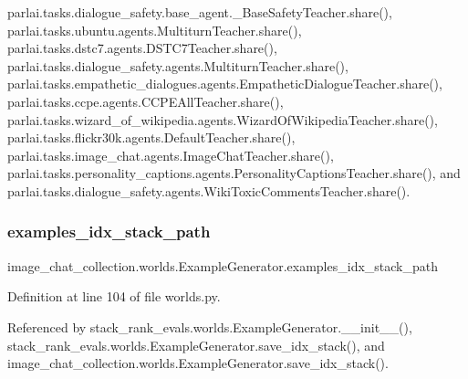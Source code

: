 parlai.\+tasks.\+dialogue\+\_\+safety.\+base\+\_\+agent.\+\_\+\+Base\+Safety\+Teacher.\+share(), parlai.\+tasks.\+ubuntu.\+agents.\+Multiturn\+Teacher.\+share(), parlai.\+tasks.\+dstc7.\+agents.\+D\+S\+T\+C7\+Teacher.\+share(), parlai.\+tasks.\+dialogue\+\_\+safety.\+agents.\+Multiturn\+Teacher.\+share(), parlai.\+tasks.\+empathetic\+\_\+dialogues.\+agents.\+Empathetic\+Dialogue\+Teacher.\+share(), parlai.\+tasks.\+ccpe.\+agents.\+C\+C\+P\+E\+All\+Teacher.\+share(), parlai.\+tasks.\+wizard\+\_\+of\+\_\+wikipedia.\+agents.\+Wizard\+Of\+Wikipedia\+Teacher.\+share(), parlai.\+tasks.\+flickr30k.\+agents.\+Default\+Teacher.\+share(), parlai.\+tasks.\+image\+\_\+chat.\+agents.\+Image\+Chat\+Teacher.\+share(), parlai.\+tasks.\+personality\+\_\+captions.\+agents.\+Personality\+Captions\+Teacher.\+share(), and parlai.\+tasks.\+dialogue\+\_\+safety.\+agents.\+Wiki\+Toxic\+Comments\+Teacher.\+share().

\mbox{\label{classimage__chat__collection_1_1worlds_1_1ExampleGenerator_ae72fb9efc3997a261057fad00bc3848c}} 
\subsubsection{\texorpdfstring{examples\+\_\+idx\+\_\+stack\+\_\+path}{examples\_idx\_stack\_path}}
{\footnotesize\ttfamily image\+\_\+chat\+\_\+collection.\+worlds.\+Example\+Generator.\+examples\+\_\+idx\+\_\+stack\+\_\+path}



Definition at line 104 of file worlds.\+py.



Referenced by stack\+\_\+rank\+\_\+evals.\+worlds.\+Example\+Generator.\+\_\+\+\_\+init\+\_\+\+\_\+(), stack\+\_\+rank\+\_\+evals.\+worlds.\+Example\+Generator.\+save\+\_\+idx\+\_\+stack(), and image\+\_\+chat\+\_\+collection.\+worlds.\+Example\+Generator.\+save\+\_\+idx\+\_\+stack().

\mbox{\label{classimage__chat__collection_1_1worlds_1_1ExampleGenerator_af50982bf2fe045e42d6d17374300c557}} 
